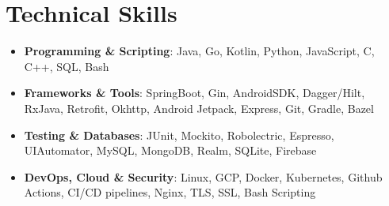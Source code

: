 \documentclass[letterpaper,1pt]{article}
\begin{document}
%
\section{Technical Skills}
\begin{itemize}[leftmargin=*, itemsep=1pt, parsep=0pt]
  \selectfont\small
  \setlength\itemsep{0em}
  \setlength\parsep{0em}
  \item \textbf{Programming \& Scripting}: Java, Go, Kotlin, Python, JavaScript, C, C++, SQL, Bash
  \item \textbf{Frameworks \& Tools}: SpringBoot, Gin, AndroidSDK, Dagger/Hilt, RxJava, Retrofit, Okhttp, Android Jetpack, Express, Git, Gradle, Bazel
  \item \textbf{Testing \& Databases}: JUnit, Mockito, Robolectric, Espresso, UIAutomator, MySQL, MongoDB, Realm, SQLite, Firebase
  \item \textbf{DevOps, Cloud \& Security}: Linux, GCP, Docker, Kubernetes, Github Actions, CI/CD pipelines, Nginx, TLS, SSL, Bash Scripting
\end{itemize}

\end{document}
